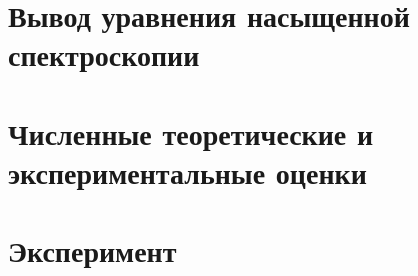 



\section{Вывод уравнения насыщенной спектроскопии}





\newpage


\section{Численные теоретические и экспериментальные оценки}


\newpage


\section{Эксперимент}
